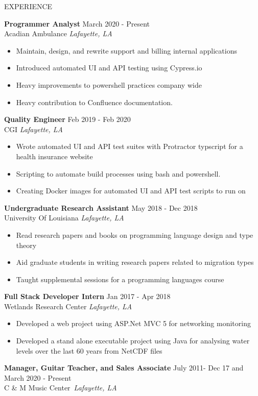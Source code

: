 \documentclass{resume} %
\begin{document}
\begin{rSection}{EXPERIENCE}

\textbf{Programmer Analyst} \hfill March 2020 - Present\\
 Acadian Ambulance \hfill \textit{Lafayette, LA}
 \begin{itemize}
    \itemsep -3pt {} 
     \item Maintain, design, and rewrite support and billing internal applications
     \item Introduced automated UI and API testing using Cypress.io
     \item Heavy improvements to powershell practices company wide
     \item Heavy contribution to Confluence documentation.
 \end{itemize}
 
\textbf{Quality Engineer} \hfill Feb 2019 - Feb 2020\\
CGI \hfill \textit{Lafayette, LA}
 \begin{itemize}
    \itemsep -3pt {} 
     \item Wrote automated UI and API test suites with Protractor typscript for a health insurance website
     \item Scripting to automate build processes using bash and powershell.
     \item Creating Docker images for automated UI and API test scripts to run on
 \end{itemize}

\textbf{Undergraduate Research Assistant} \hfill May 2018 - Dec 2018\\
 University Of Louisiana \hfill \textit{Lafayette, LA}
 \begin{itemize}
    \itemsep -3pt {} 
     \item Read research papers and books on programming language design and type theory
     \item Aid graduate students in writing research papers related to migration types
     \item Taught supplemental sessions for a programming languages course
 \end{itemize}

\textbf{Full Stack Developer Intern} \hfill Jan 2017 - Apr 2018\\
 Wetlands Research Center \hfill \textit{Lafayette, LA}
 \begin{itemize}
    \itemsep -3pt {} 
     \item Developed a web project using ASP.Net MVC 5 for networking monitoring
     \item Developed a stand alone executable project using Java for analysing water levels over the last 60 years from NetCDF files
 \end{itemize}

\textbf{Manager, Guitar Teacher, and Sales Associate} \hfill July 2011- Dec 17 and March 2020 - Present\\
 C \& M Music Center \hfill \textit{Lafayette, LA}

\end{rSection} 
\end{document}
